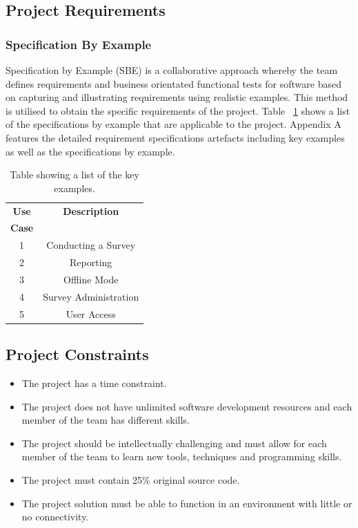 \documentclass[12pt]{witseiepaper}
\begin{document}
\subsection{Project Requirements}
\subsubsection{Specification By Example}
Specification by Example (SBE) is a collaborative approach whereby the team defines requirements and business orientated functional tests for software based on capturing and illustrating requirements using realistic examples. This method is utilised to obtain the specific requirements of the project.
Table ~\ref{tbl:use} shows a list of the specifications by example that are applicable to the project. Appendix A features the detailed requirement specifications artefacts including key examples as well as the specifications by example.

\begin{table}[htb] \caption{Table showing a list of the key examples.} \label{tbl:use} 
    \begin{center}
  \begin{tabular}
    {|c|c|} \hline \textbf{Use} &\textbf{Description}\\
    \textbf{Case} &\\
    \hline 1 &Conducting a Survey\\
    \hline 2 &Reporting\\
    \hline 3 &Offline Mode\\
    \hline 4 &Survey Administration\\
    \hline 5 &User Access\\
    \hline 
  \end{tabular}
      \end{center}
\end{table}

\subsection{Project Constraints}
\begin{itemize}
  \item The project has a time constraint. 
  \item The project does not have unlimited software development resources and each member of the team has different skills. 
  \item The project should be intellectually challenging and must allow for each member of the team to learn new tools, techniques and programming skills.
  \item The project must contain 25\% original source code.
  \item The project solution must be able to function in an environment with little or no connectivity.
\end{itemize}
\end{document}
